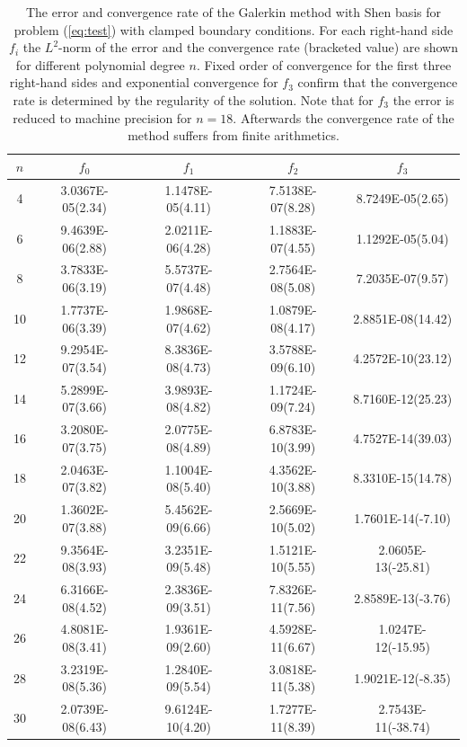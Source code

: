 \documentclass{marine_2015}
\begin{document}
\begin{table}[t!]
    \begin{center}
    \begin{tabular}{ccccc}
\hline
$n$  &  $f_0$  & $f_1$ & $f_2$ & $f_3$\\
\hline
4 &  3.0367E-05(2.34)& 1.1478E-05(4.11)& 7.5138E-07(8.28)& 8.7249E-05(2.65)  \\ 
6 &  9.4639E-06(2.88)& 2.0211E-06(4.28)& 1.1883E-07(4.55)& 1.1292E-05(5.04) \\
8 &  3.7833E-06(3.19)& 5.5737E-07(4.48)& 2.7564E-08(5.08)& 7.2035E-07(9.57) \\
10&  1.7737E-06(3.39)& 1.9868E-07(4.62)& 1.0879E-08(4.17)& 2.8851E-08(14.42) \\
12&  9.2954E-07(3.54)& 8.3836E-08(4.73)& 3.5788E-09(6.10)& 4.2572E-10(23.12) \\
14&  5.2899E-07(3.66)& 3.9893E-08(4.82)& 1.1724E-09(7.24)& 8.7160E-12(25.23) \\
16&  3.2080E-07(3.75)& 2.0775E-08(4.89)& 6.8783E-10(3.99)& 4.7527E-14(39.03) \\
18&  2.0463E-07(3.82)& 1.1004E-08(5.40)& 4.3562E-10(3.88)& 8.3310E-15(14.78) \\
20&  1.3602E-07(3.88)& 5.4562E-09(6.66)& 2.5669E-10(5.02)& 1.7601E-14(-7.10) \\
22&  9.3564E-08(3.93)& 3.2351E-09(5.48)& 1.5121E-10(5.55)& 2.0605E-13(-25.81)\\
24&  6.3166E-08(4.52)& 2.3836E-09(3.51)& 7.8326E-11(7.56)& 2.8589E-13(-3.76) \\
26&  4.8081E-08(3.41)& 1.9361E-09(2.60)& 4.5928E-11(6.67)& 1.0247E-12(-15.95)\\
28&  3.2319E-08(5.36)& 1.2840E-09(5.54)& 3.0818E-11(5.38)& 1.9021E-12(-8.35) \\
30&  2.0739E-08(6.43)& 9.6124E-10(4.20)& 1.7277E-11(8.39)& 2.7543E-11(-38.74)\\
\hline
    \end{tabular}
    \caption{
    The error and convergence rate of the Galerkin method with Shen basis for
    problem (\ref{eq:test}) with clamped boundary conditions. For each
    right-hand side $f_i$ the $L^2$-norm of the error and the convergence rate
    (bracketed value) are shown for different polynomial degree $n$. Fixed order of
    convergence for the first three right-hand sides and exponential convergence
    for $f_3$ confirm that the convergence rate is determined by the regularity of 
    the solution. Note that for $f_3$ the error is reduced to machine precision
    for $n=18$. Afterwards the convergence rate of the method suffers from
    finite arithmetics.}
  \label{tab:shen_convergence}
  \end{center}
  \end{table}
\end{document}
